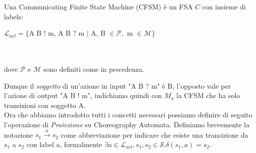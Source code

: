 \begin{definition} \label{def:CommunicatingFiniteStateMachine}
    Una Communicating Finite State Machine (CFSM) è un FSA $C$ con insieme di labels: \bigskip \\
    \centerline{$\mathcal{L}_{act} = \{$A B ! m, A B ? m $|$ A, B $ \in \mathcal{P},$ m $ \in \mathcal{M}\}$}
    \\ \\
    dove $\mathcal{P}$ e $\mathcal{M}$ sono definiti come in precedenza.
\end{definition}
Dunque il \emph{soggetto} di un'azione in input "A B ? m" è B, l'opposto vale per l'azione di output "A B ! m", indichiamo quindi con $M_a$ la CFSM che ha solo transizioni con soggetto A.\\
Ora che abbiamo introdotto tutti i concetti necessari possiamo definire di seguito l'operazione di \emph{Proiezione} su Choreography Automata.
Definiamo brevemente la notazione $s_1 \xrightarrow{a} s_{2}$ come abbreviazione per indicare che esiste una transizione da $s_1$ a $s_2$ con label a, formalmente $\exists a \in \mathcal{L}_{act}, s_1, s_2 \in \mathcal{S}. \delta(s_1, a) = s_2$.

